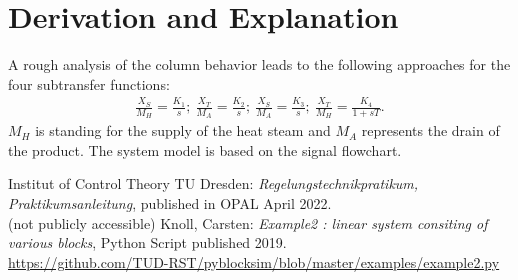 \documentclass[10pt,a4paper]{article}
\begin{document}
	
	\section{Derivation and Explanation} %
	A rough analysis of the column behavior leads to the following approaches for the four subtransfer functions:
	\begin{align*}
		\frac{X_S}{M_H} = \frac{K_1}{s};\ \frac{X_T}{M_A} = \frac{K_2}{s};\ \frac{X_S}{M_A} = \frac{K_3}{s};\ \frac{X_T}{M_H} = \frac{K_4}{1 + sT}.
	\end{align*}
	$M_H$ is standing for the supply of the heat steam and $M_A$ represents the drain of the product. The system model is based on the signal flowchart.
	
	
	\begin{thebibliography}{10}		
		Institut of Control Theory TU Dresden: \textit{Regelungstechnikpratikum, Praktikumsanleitung}, published in OPAL April 2022. \\
		(not publicly accessible)
		Knoll, Carsten: \textit{Example2 : linear system consiting of various blocks}, Python Script published 2019. \\
		\url{https://github.com/TUD-RST/pyblocksim/blob/master/examples/example2.py}  
	\end{thebibliography}
\end{document}
